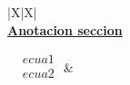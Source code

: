 \documentclass[../main.tex]{subfiles}
\begin{document}
\vspace*{-\baselineskip}
\vspace*{-\baselineskip}
\begin{xltabular}{\textwidth}{|X|X|}
	\hline
	\\
	\hline
	\underline{\textbf{Anotacion seccion}}

	$\begin{aligned}
			 & ecua1 \\
			 & ecua2 \\
		\end{aligned}$
	\newline\newline
	&
	 \\
	\hline
\end{xltabular}
\end{document}
